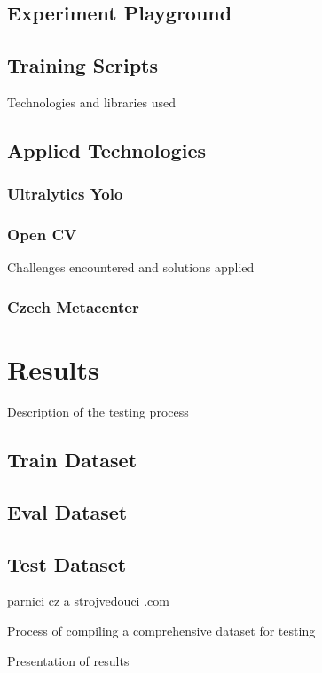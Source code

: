 \documentclass[english, ing, kiv, he, iso690alph, pdf, viewonly]{fasthesis}
\begin{document}
\section{Experiment Playground}

\section{Training Scripts}


Technologies and libraries used
\section{Applied Technologies}

\subsection{Ultralytics Yolo}

\subsection{Open CV}

Challenges encountered and solutions applied
\subsection{Czech Metacenter}

\chapter{Results}

Description of the testing process


\section{Train Dataset}

\section{Eval Dataset}

\section{Test Dataset}
 parnici cz a strojvedouci .com

 
Process of compiling a comprehensive dataset for testing


Presentation of results
\end{document}
